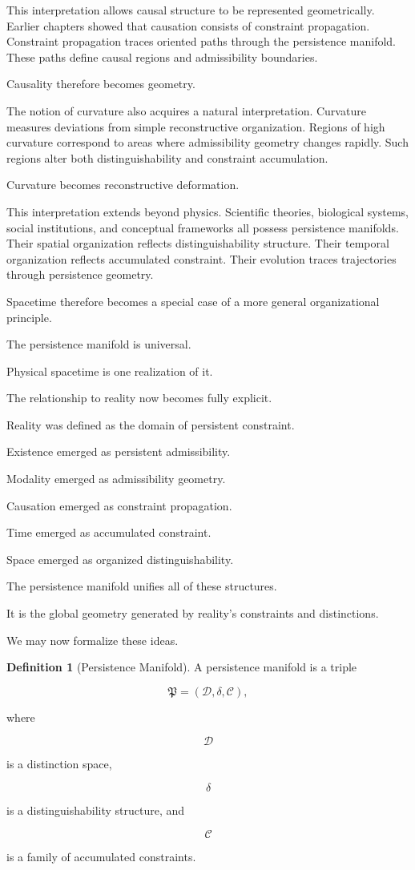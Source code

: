 \documentclass[12pt,oneside]{article}
\theoremstyle{definition}
\newtheorem{definition}[theorem]{Definition} \newtheorem{axiom}[theorem]{Axiom} \newtheorem{remark}[theorem]{Remark} \newtheorem{example}[theorem]{Example}
\begin{document}
This interpretation allows causal structure to be represented geometrically. Earlier chapters showed that causation consists of constraint propagation. Constraint propagation traces oriented paths through the persistence manifold. These paths define causal regions and admissibility boundaries.

Causality therefore becomes geometry.

The notion of curvature also acquires a natural interpretation. Curvature measures deviations from simple reconstructive organization. Regions of high curvature correspond to areas where admissibility geometry changes rapidly. Such regions alter both distinguishability and constraint accumulation.

Curvature becomes reconstructive deformation.

This interpretation extends beyond physics. Scientific theories, biological systems, social institutions, and conceptual frameworks all possess persistence manifolds. Their spatial organization reflects distinguishability structure. Their temporal organization reflects accumulated constraint. Their evolution traces trajectories through persistence geometry.

Spacetime therefore becomes a special case of a more general organizational principle.

The persistence manifold is universal.

Physical spacetime is one realization of it.

The relationship to reality now becomes fully explicit.

Reality was defined as the domain of persistent constraint.

Existence emerged as persistent admissibility.

Modality emerged as admissibility geometry.

Causation emerged as constraint propagation.

Time emerged as accumulated constraint.

Space emerged as organized distinguishability.

The persistence manifold unifies all of these structures.

It is the global geometry generated by reality's constraints and distinctions.

We may now formalize these ideas.

\begin{definition}[Persistence Manifold]

A persistence manifold is a triple

\[
\mathfrak P
=
(\mathcal D,\delta,\mathcal C),
\]

where

\[
\mathcal D
\]

is a distinction space,

\[
\delta
\]

is a distinguishability structure, and

\[
\mathcal C
\]

is a family of accumulated constraints.

\end{definition}
\end{document}
